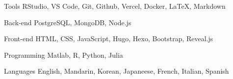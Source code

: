 

\begin{cvskills}

  \cvskill
    {Tools} %
    {RStudio, VS Code, Git, Github, Vercel, Docker, LaTeX, Markdown} %

  \cvskill
    {Back-end} %
    {PostgreSQL, MongoDB, Node.js} %

  \cvskill
    {Front-end} %
    {HTML, CSS, JavaScript, Hugo, Hexo,  Bootstrap, Reveal.js} %

  \cvskill
    {Programming} %
    {Matlab, R, Python, Julia} %

  \cvskill
    {Languages} %
    {English, Mandarin, Korean, Japaneese, French, Italian, Spanish} %

\end{cvskills}
